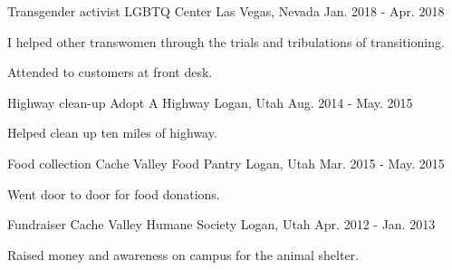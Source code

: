 


\begin{cventries}


\cventry
{Transgender activist} %
{LGBTQ Center} %
{Las Vegas, Nevada} %
{Jan. 2018 - Apr. 2018} %
{ %
\begin{cvitems}
\item {I helped other transwomen through the trials and tribulations of transitioning.}
\item {Attended to customers at front desk.}
\end{cvitems}
}


\cventry
{Highway clean-up} %
{Adopt A Highway} %
{Logan, Utah} %
{Aug. 2014 - May. 2015} %
{ %
\begin{cvitems}
\item {Helped clean up ten miles of highway.}
\end{cvitems}
}


\cventry
{Food collection} %
{Cache Valley Food Pantry} %
{Logan, Utah} %
{Mar. 2015 - May. 2015} %
{ %
\begin{cvitems}
\item {Went door to door for food donations.}
\end{cvitems} 
}


\cventry
{Fundraiser} %
{Cache Valley Humane Society} %
{Logan, Utah} %
{Apr. 2012 - Jan. 2013} %
{ %
\begin{cvitems}
\item {Raised money and awareness on campus for the animal shelter.}
\end{cvitems} 
}

\end{cventries}